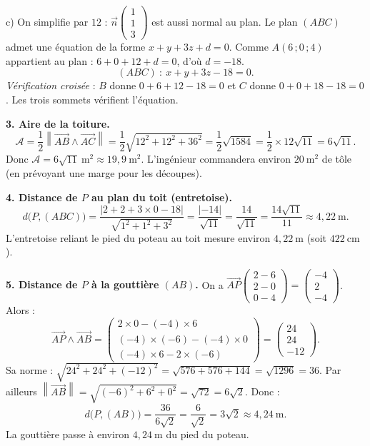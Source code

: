 \documentclass[11pt]{article}
\begin{document}
\begin{exoresolu}
c) On simplifie par $12$ : $\vec{n}\begin{pmatrix}1\\1\\3\end{pmatrix}$ est aussi normal au plan. Le plan $(ABC)$ admet une équation de la forme $x+y+3z+d=0$. Comme $A(6\,;0\,;4)$ appartient au plan : $6+0+12+d=0$, d'où $d=-18$.
\[ (ABC)\ :\ x+y+3z-18=0. \]
\emph{Vérification croisée} : $B$ donne $0+6+12-18=0$ et $C$ donne $0+0+18-18=0$. Les trois sommets vérifient l'équation.

\textbf{3. Aire de la toiture.}
\[ \mathscr{A}=\frac{1}{2}\left\|\overrightarrow{AB}\wedge\overrightarrow{AC}\right\|=\frac{1}{2}\sqrt{12^2+12^2+36^2}=\frac{1}{2}\sqrt{1584}=\frac{1}{2}\times 12\sqrt{11}=6\sqrt{11}. \]
Donc $\mathscr{A}=6\sqrt{11}\ \mathrm{m}^2\approx 19{,}9\ \mathrm{m}^2$. L'ingénieur commandera environ $20\ \mathrm{m}^2$ de tôle (en prévoyant une marge pour les découpes).

\textbf{4. Distance de $P$ au plan du toit (entretoise).}
\[ d\big(P,(ABC)\big)=\frac{|2+2+3\times 0-18|}{\sqrt{1^2+1^2+3^2}}=\frac{|-14|}{\sqrt{11}}=\frac{14}{\sqrt{11}}=\frac{14\sqrt{11}}{11}\approx 4{,}22\ \mathrm{m}. \]
L'entretoise reliant le pied du poteau au toit mesure environ $4{,}22\ \mathrm{m}$ (soit $422\ \mathrm{cm}$).

\textbf{5. Distance de $P$ à la gouttière $(AB)$.}
On a $\overrightarrow{AP}\begin{pmatrix}2-6\\2-0\\0-4\end{pmatrix}=\begin{pmatrix}-4\\2\\-4\end{pmatrix}$. Alors :
\[ \overrightarrow{AP}\wedge\overrightarrow{AB}=\begin{pmatrix} 2\times 0-(-4)\times 6 \\ (-4)\times(-6)-(-4)\times 0 \\ (-4)\times 6-2\times(-6) \end{pmatrix}=\begin{pmatrix}24\\24\\-12\end{pmatrix}. \]
Sa norme : $\sqrt{24^2+24^2+(-12)^2}=\sqrt{576+576+144}=\sqrt{1296}=36$.
Par ailleurs $\left\|\overrightarrow{AB}\right\|=\sqrt{(-6)^2+6^2+0^2}=\sqrt{72}=6\sqrt{2}$.
Donc :
\[ d\big(P,(AB)\big)=\frac{36}{6\sqrt{2}}=\frac{6}{\sqrt{2}}=3\sqrt{2}\approx 4{,}24\ \mathrm{m}. \]
La gouttière passe à environ $4{,}24\ \mathrm{m}$ du pied du poteau.


\end{exoresolu}
\end{document}
